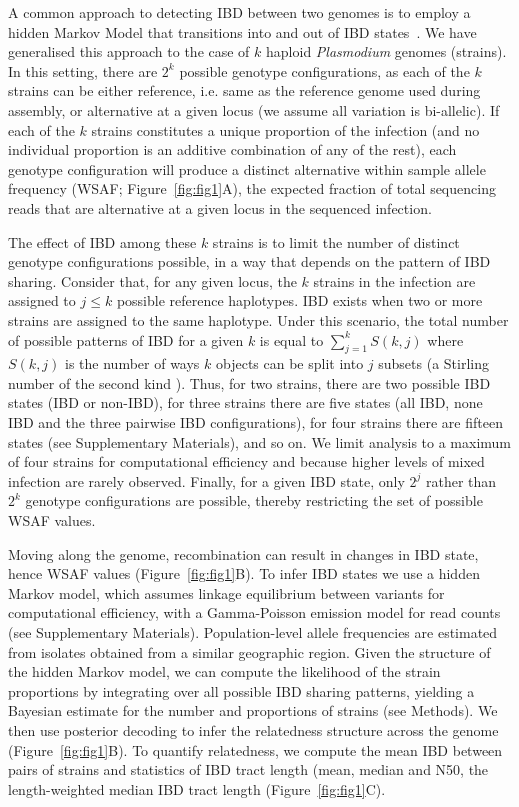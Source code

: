 \documentclass[9pt,lineno]{elife}
\begin{document}
A common approach to detecting IBD between two genomes is to employ a hidden Markov Model that transitions into and out of IBD states~\citep{Chang2015, Gusev2009, Gusev2011}.  We have generalised this approach to the case of $k$ haploid {\it Plasmodium} genomes (strains). In this setting, there are $2^k$ possible genotype configurations, as each of the $k$ strains can be either reference, i.e. same as the reference genome used during assembly, or alternative at a given locus (we assume all variation is bi-allelic). If each of the $k$ strains constitutes a unique proportion of the infection (and no individual proportion is an additive combination of any of the rest), each genotype configuration will produce a distinct alternative within sample allele frequency (WSAF; Figure~\ref{fig:fig1}A), the expected fraction of total sequencing reads that are alternative at a given locus in the sequenced infection.

The effect of IBD among these $k$ strains is to limit the number of distinct genotype configurations possible, in a way that depends on the pattern of IBD sharing. Consider that, for any given locus, the $k$ strains in the infection are assigned to $j \leq k$ possible reference haplotypes. IBD exists when two or more strains are assigned to the same haplotype. Under this scenario, the total number of possible patterns of IBD for a given $k$ is equal to $\sum_{j=1}^{k} S(k,j)$ where $S(k,j)$ is the number of ways $k$ objects can be split into $j$ subsets (a Stirling number of the second kind \citep{Ronald1988}). Thus, for two strains, there are two possible IBD states (IBD or non-IBD), for three strains there are five states (all IBD, none IBD and the three pairwise IBD configurations), for four strains there are fifteen states (see Supplementary Materials), and so on. We limit analysis to a maximum of four strains for computational efficiency and because higher levels of mixed infection are rarely observed. Finally, for a given IBD state, only $2^j$ rather than $2^k$ genotype configurations are possible, thereby restricting the set of possible WSAF values.

Moving along the genome, recombination can result in changes in IBD state, hence WSAF values (Figure~\ref{fig:fig1}B).  To infer IBD states we use a hidden Markov model, which assumes linkage equilibrium between variants for computational efficiency, with a Gamma-Poisson emission model for read counts (see Supplementary Materials).  Population-level allele frequencies are estimated from isolates obtained from a similar geographic region.  Given the structure of the hidden Markov model, we can compute the likelihood of the strain proportions by integrating over all possible IBD sharing patterns, yielding a Bayesian estimate for the number and proportions of strains (see Methods).  We then use posterior decoding to infer the relatedness structure across the genome (Figure~\ref{fig:fig1}B). To quantify relatedness, we compute the mean IBD between pairs of strains and statistics of IBD tract length (mean, median and N50, the length-weighted median IBD tract length (Figure~\ref{fig:fig1}C).
\end{document}
